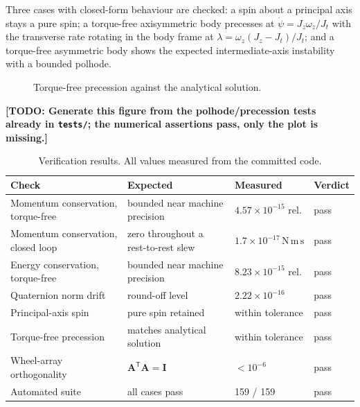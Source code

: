 \documentclass[conference,10pt,a4paper]{IEEEtran}
\newif\ifdraftmode
\newcommand{\TODO}[1]{\textbf{[TODO: #1]}}
\newcommand{\TODO}[1]{}
\newcommand{\figplaceholder}[2]{%
  \ifdraftmode
    \setlength{\fboxsep}{4pt}%
    \fbox{%
      \parbox[c][#1][c]{\dimexpr\linewidth-2\fboxsep-2\fboxrule\relax}{%
        \centering\scriptsize\textsc{figure placeholder}\\[3pt]
        \itshape #2}}%
  \else
    \parbox[c][#1][c]{\linewidth}{}%
  \fi}
\newcommand{\mat}[1]{\bm{#1}}
\newcommand{\T}{^{\mathsf{T}}}
\newcommand{\unit}[1]{\ensuremath{\,\mathrm{#1}}}
\begin{document}
Three cases with closed-form behaviour are checked: a spin about a principal
axis stays a pure spin; a torque-free axisymmetric body precesses at
$\dot\psi = J_z\omega_z/J_t$ with the transverse rate rotating in the body frame
at $\lambda=\omega_z(J_z-J_t)/J_t$; and a torque-free asymmetric body shows the
expected intermediate-axis instability with a bounded polhode.

\begin{figure}[!t]
\centering
\figplaceholder{45mm}{Torque-free precession: simulated transverse rate
components against the analytical solution, with the residual on a second axis.}
\caption{Torque-free precession against the analytical solution.}
\label{fig:precession}
\end{figure}

\TODO{Generate this figure from the polhode/precession tests already in
\texttt{tests/}; the numerical assertions pass, only the plot is missing.}

\begin{table}[!t]
\centering
\caption{Verification results. All values measured from the committed code.}
\label{tab:verification}
\footnotesize
\begin{tabularx}{\textwidth}{@{}p{}Xll@{}}
\toprule
\textbf{Check} & \textbf{Expected} & \textbf{Measured} & \textbf{Verdict} \\
\midrule
Momentum conservation, torque-free & bounded near machine precision & $4.57\times10^{-15}$ rel. & pass \\
Momentum conservation, closed loop & zero throughout a rest-to-rest slew & $1.7\times10^{-17}\unit{N\,m\,s}$ & pass \\
Energy conservation, torque-free   & bounded near machine precision & $8.23\times10^{-15}$ rel. & pass \\
Quaternion norm drift              & round-off level                & $2.22\times10^{-16}$ & pass \\
Principal-axis spin                & pure spin retained             & within tolerance & pass \\
Torque-free precession             & matches analytical solution    & within tolerance & pass \\
Wheel-array orthogonality          & $\mat{A}\T\mat{A}=\mat{I}$     & $<10^{-6}$ & pass \\
Automated suite                    & all cases pass                 & 159 / 159 & pass \\
\bottomrule
\end{tabularx}
\end{table}
\end{document}
